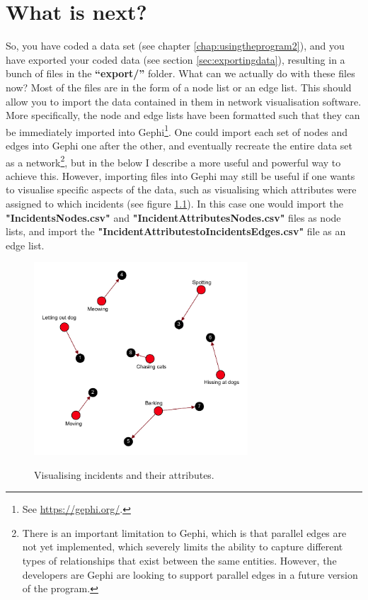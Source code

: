 \documentclass{memoir}
\begin{document}
\chapter{What is next?}
\label{chap:whatisnext}

So, you have coded a data set (see chapter \ref{chap:usingtheprogram2}), and you have exported your coded data (see section \ref{sec:exportingdata}), resulting in a bunch of files in the \textbf{``export/''} folder. What can we actually do with these files now? Most of the files are in the form of a node list or an edge list. This should allow you to import the data contained in them in network visualisation software. More specifically, the node and edge lists have been formatted such that they can be immediately imported into Gephi\footnote{See \url{https://gephi.org/}.}. One could import each set of nodes and edges into Gephi one after the other, and eventually recreate the entire data set as a network\footnote{There is an important limitation to Gephi, which is that parallel edges are not yet implemented, which severely limits the ability to capture different types of relationships that exist between the same entities. However, the developers are Gephi are looking to support parallel edges in a future version of the program.}, but in the below I describe a more useful and powerful way to achieve this. However, importing files into Gephi may still be useful if one wants to visualise specific aspects of the data, such as visualising which attributes were assigned to which incidents (see figure \ref{fig:network}). In this case one would import the \textbf{"Incidents\textunderscore Nodes.csv"} and \textbf{"Incident\textunderscore Attributes\textunderscore Nodes.csv"} files as node lists, and import the \textbf{"Incident\textunderscore Attributes\textunderscore to\textunderscore Incidents\textunderscore Edges.csv"} file as an edge list.

\begin{figure}[h!]
  \centering
  \caption{Visualising incidents and their attributes.}
  \includegraphics[width=80mm]{Diagram_5.pdf}
  \label{fig:network}
\end{figure}
\end{document}

